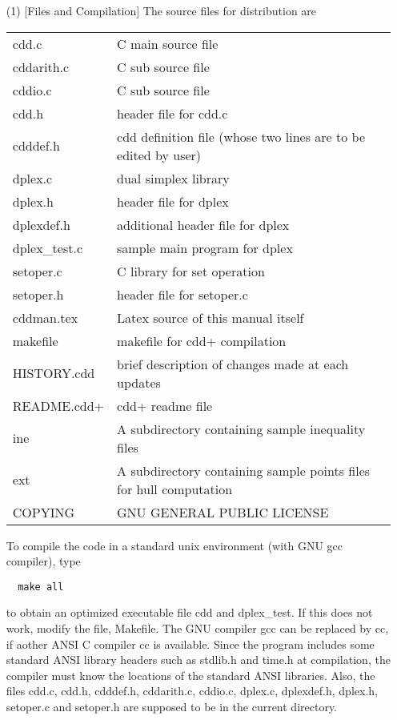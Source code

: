 \documentclass[11pt]{article}
\begin{document}
\begin{itemize}
\item[(1)] [Files and Compilation] The source files for distribution are

\begin{tabular}{ll}
     cdd.c       &   C main source file\\
     cddarith.c  &   C sub source file\\  
     cddio.c     &   C sub source file\\  
     cdd.h       &   header file for cdd.c\\
     cdddef.h    &   cdd definition file (whose two lines are to be edited by user)\\
     dplex.c     &  dual simplex library\\
     dplex.h     & header file for dplex\\
     dplexdef.h  & additional header file for dplex\\
     dplex\_test.c  & sample main program for dplex\\
     setoper.c   &   C library for set operation\\
     setoper.h   &   header file for setoper.c \\
     cddman.tex  &  Latex source of this manual itself\\
     makefile    &  makefile for cdd+ compilation\\
     HISTORY.cdd  &   brief description of changes made at each updates\\
     README.cdd+  &  cdd+ readme file\\
     ine         &   A subdirectory containing sample inequality files\\
     ext         &   A subdirectory containing sample points files for hull computation\\
     COPYING     &   GNU GENERAL PUBLIC LICENSE
\end{tabular}

\noindent
To compile the code in a standard unix environment (with GNU gcc compiler), type
\begin{verbatim}
  make all
\end{verbatim}
to obtain an optimized executable file cdd and dplex\_test.  If this does not work,
modify the file, Makefile. The GNU compiler gcc can be replaced by cc, 
if aother ANSI  C compiler cc is available.
Since the program includes some standard ANSI library 
headers such as stdlib.h and time.h at compilation, 
the compiler must know the locations of the standard ANSI libraries.
Also, the files cdd.c, cdd.h, cdddef.h, cddarith.c, cddio.c, dplex.c, dplexdef.h,
dplex.h, setoper.c and  setoper.h are supposed to be
in the current directory.


\end{itemize}
\end{document}
